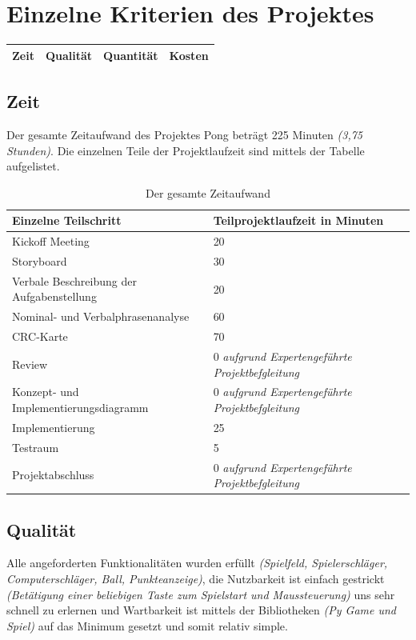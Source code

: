 \documentclass[a4paper,12pt]{article}
\begin{document}
\section{Einzelne Kriterien des Projektes}
\begin{center}
    \begin{tabular}{|l|l|l|l|}
        \hline
        Zeit & Qualität & Quantität & Kosten \\
        \hline
    \end{tabular}
\end{center}
\subsection{Zeit}
Der gesamte Zeitaufwand des Projektes Pong beträgt 225 Minuten \textit{(3,75 Stunden)}. Die einzelnen Teile der Projektlaufzeit sind mittels der Tabelle aufgelistet.
\begin{table}[ht]
\centering
    \begin{tabular}{|l|l|}
        \hline
        \textbf{Einzelne Teilschritt} & \textbf{Teilprojektlaufzeit in Minuten} \\
        \hline
        Kickoff Meeting & 20 \\
        Storyboard & 30 \\
        Verbale Beschreibung der Aufgabenstellung & 20 \\
        Nominal- und Verbalphrasenanalyse & 60 \\
        CRC-Karte & 70 \\
        Review & 0 \textit{aufgrund Expertengeführte Projektbefgleitung} \\
        Konzept- und Implementierungsdiagramm & 0 \textit{aufgrund Expertengeführte Projektbefgleitung} \\
        Implementierung & 25 \\
        Testraum & 5 \\
        Projektabschluss & 0 \textit{aufgrund Expertengeführte Projektbefgleitung} \\
        \hline
    \end{tabular}
    \caption{Der gesamte Zeitaufwand}
\label{tab:der-gesamte-zeitaufwand}
\end{table}
\subsection{Qualität}
Alle angeforderten Funktionalitäten wurden erfüllt \textit{(Spielfeld, Spielerschläger, Computerschläger, Ball, Punkteanzeige)}, die Nutzbarkeit ist einfach gestrickt \textit{(Betätigung einer beliebigen Taste zum Spielstart und Maussteuerung)} uns sehr schnell zu erlernen und Wartbarkeit ist mittels der Bibliotheken \textit{(Py Game und Spiel)} auf das Minimum gesetzt und somit relativ simple.
\end{document}
